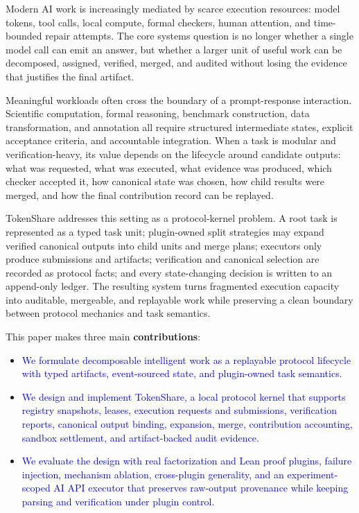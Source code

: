 \documentclass{article}
\theoremstyle{plain}
\begin{document}
{\color{blue}
Modern AI work is increasingly mediated by scarce execution resources: model tokens, tool calls, local compute, formal checkers, human attention, and time-bounded repair attempts. The core systems question is no longer whether a single model call can emit an answer, but whether a larger unit of useful work can be decomposed, assigned, verified, merged, and audited without losing the evidence that justifies the final artifact.

Meaningful workloads often cross the boundary of a prompt-response interaction. Scientific computation, formal reasoning, benchmark construction, data transformation, and annotation all require structured intermediate states, explicit acceptance criteria, and accountable integration. When a task is modular and verification-heavy, its value depends on the lifecycle around candidate outputs: what was requested, what was executed, what evidence was produced, which checker accepted it, how canonical state was chosen, how child results were merged, and how the final contribution record can be replayed.

TokenShare addresses this setting as a protocol-kernel problem. A root task is represented as a typed task unit; plugin-owned split strategies may expand verified canonical outputs into child units and merge plans; executors only produce submissions and artifacts; verification and canonical selection are recorded as protocol facts; and every state-changing decision is written to an append-only ledger. The resulting system turns fragmented execution capacity into auditable, mergeable, and replayable work while preserving a clean boundary between protocol mechanics and task semantics.
}

This paper makes three main \textbf{contributions}:

\begin{itemize}
\item \textcolor{blue}{We formulate decomposable intelligent work as a replayable protocol lifecycle with typed artifacts, event-sourced state, and plugin-owned task semantics.}
 \item \textcolor{blue}{We design and implement TokenShare, a local protocol kernel that supports registry snapshots, leases, execution requests and submissions, verification reports, canonical output binding, expansion, merge, contribution accounting, sandbox settlement, and artifact-backed audit evidence.}
\item  \textcolor{blue}{We evaluate the design with real factorization and Lean proof plugins, failure injection, mechanism ablation, cross-plugin generality, and an experiment-scoped AI API executor that preserves raw-output provenance while keeping parsing and verification under plugin control.}
\end{itemize}
\end{document}
